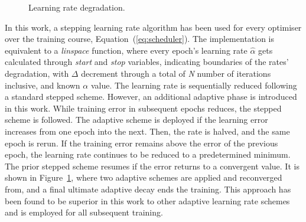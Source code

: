 \begin{figure}[ht]
    \centering
    
    \caption{Learning rate degradation.}
    \label{fig:l_rate_progress}
\end{figure}
In this work, a stepping learning rate algorithm has been used for every optimiser over the training course, Equation~(\ref{eq:scheduler}).
The implementation is equivalent to a \textit{linspace} function, where every epoch's learning rate $\hat{\alpha}$ gets calculated through \textit{start} and \textit{stop} variables, indicating boundaries of the rates' degradation, with $\Delta$ decrement through a total of \textit{N} number of iterations inclusive, and known $\alpha$ value.
%
The learning rate is sequentially reduced following a standard stepped scheme.
However, an additional adaptive phase is introduced in this work.
While training error in subsequent epochs reduces, the stepped scheme is followed.
The adaptive scheme is deployed if the learning error increases from one epoch into the next.
Then, the rate is halved, and the same epoch is rerun.
If the training error remains above the error of the previous epoch, the learning rate continues to be reduced to a predetermined minimum.
The prior stepped scheme resumes if the error returns to a convergent value.
It is shown in Figure~\ref{fig:l_rate_progress}, where two adaptive schemes are applied and reconverged from, and a final ultimate adaptive decay ends the training.
%
This approach has been found to be superior in this work to other adaptive learning rate schemes and is employed for all subsequent training.
%
